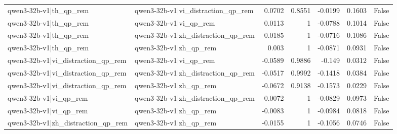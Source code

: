 \begin{table}
\begin{tabular}{l l r r r r l}
qwen3-32b-v1|th_qp_rem & qwen3-32b-v1|vi_distraction_qp_rem & 0.0702 & 0.8551 & -0.0199 & 0.1603 & False \\
qwen3-32b-v1|th_qp_rem & qwen3-32b-v1|vi_qp_rem & 0.0113 & 1 & -0.0788 & 0.1014 & False \\
qwen3-32b-v1|th_qp_rem & qwen3-32b-v1|zh_distraction_qp_rem & 0.0185 & 1 & -0.0716 & 0.1086 & False \\
qwen3-32b-v1|th_qp_rem & qwen3-32b-v1|zh_qp_rem & 0.003 & 1 & -0.0871 & 0.0931 & False \\
qwen3-32b-v1|vi_distraction_qp_rem & qwen3-32b-v1|vi_qp_rem & -0.0589 & 0.9886 & -0.149 & 0.0312 & False \\
qwen3-32b-v1|vi_distraction_qp_rem & qwen3-32b-v1|zh_distraction_qp_rem & -0.0517 & 0.9992 & -0.1418 & 0.0384 & False \\
qwen3-32b-v1|vi_distraction_qp_rem & qwen3-32b-v1|zh_qp_rem & -0.0672 & 0.9138 & -0.1573 & 0.0229 & False \\
qwen3-32b-v1|vi_qp_rem & qwen3-32b-v1|zh_distraction_qp_rem & 0.0072 & 1 & -0.0829 & 0.0973 & False \\
qwen3-32b-v1|vi_qp_rem & qwen3-32b-v1|zh_qp_rem & -0.0083 & 1 & -0.0984 & 0.0818 & False \\
qwen3-32b-v1|zh_distraction_qp_rem & qwen3-32b-v1|zh_qp_rem & -0.0155 & 1 & -0.1056 & 0.0746 & False \\
\bottomrule
\end{tabular}
\end{table}
